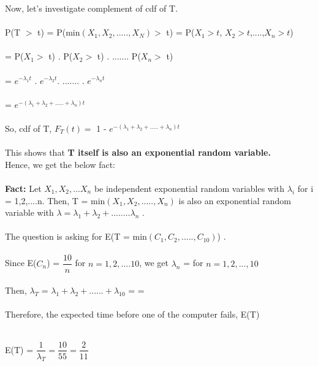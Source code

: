 \documentclass[11pt]{article}
\begin{document}
\noindent Now, let's investigate complement of cdf of T. \\\\
\noindent P(T $>$ t) = P(min$(X_1,X_2,.....,X_N) > $ t) = P($X_1 > t$, $X_2 > t$,....,$X_n > t$) \\ \\ = P($X_1 > $ t) .   P($X_2 > $ t) . .......  P($X_n > $ t)  \\ \\
= $e^{-\lambda_1 t}$ . $e^{-\lambda_2 t}$. ....... . $e^{-\lambda_n t}$ \\ \\
= $e^{-(\lambda_1 + \lambda_2 + ..... + \lambda_n)t}$ \\ \\ 

\noindent So, cdf of T, $F_T(t) = $ 1 - $e^{-(\lambda_1 + \lambda_2 + ..... + \lambda_n)t}$ \\ \\

\noindent This shows that \textbf{T itself is also an exponential random variable.} \\
Hence, we get the below fact: \\ \\
\textbf{Fact:} Let $X_1 , X_2, ... X_n$ be independent exponential random variables with $\lambda_i$ for i = 1,2,....n. Then, T = min$(X_1,X_2,.....,X_n)$ is also an exponential random variable with $\lambda = 
\lambda_1 + \lambda_2 + ........ \lambda_n $ . \\ \\

\noindent The question is asking for E(T = min$(C_1,C_2,.....,C_{10})$) . \\ \\

\noindent Since E($C_n$) = $ \dfrac{10}{n}$ for $n = 1,2, .... 10$, we get $\lambda_n$ =  for $ n = 1,2,...,10$ \\ \\

\noindent Then, $\lambda_T$ = $\lambda_1 + \lambda_2 + ...... + \lambda_{10}$ =  =  \\ \\

\noindent Therefore, the expected time before one of the computer fails, E(T) \\ \\

\begin{center}
    E(T) =  $\dfrac{1}{\lambda_T} = \dfrac{10}{55} = \dfrac{2}{11}$
\end{center}
\end{document}
